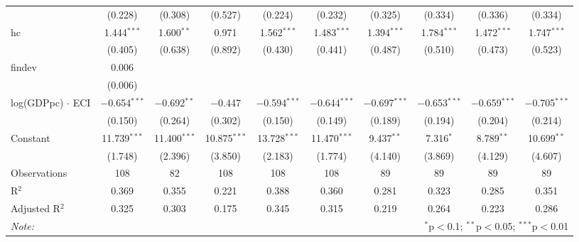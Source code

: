 \begin{tabular}{@{\hspace{5pt}}l@{\hspace{5pt}}ccccccccc}
  & (0.228) & (0.308) & (0.527) & (0.224) & (0.232) & (0.325) & (0.334) & (0.336) & (0.334) \\ 
 \addlinespace 
 hc & 1.444$^{***}$ & 1.600$^{**}$ & 0.971 & 1.562$^{***}$ & 1.483$^{***}$ & 1.394$^{***}$ & 1.784$^{***}$ & 1.472$^{***}$ & 1.747$^{***}$ \\ 
  & (0.405) & (0.638) & (0.892) & (0.430) & (0.441) & (0.487) & (0.510) & (0.473) & (0.523) \\ 
 \addlinespace 
 findev & 0.006 &  &  &  &  &  &  &  &  \\ 
  & (0.006) &  &  &  &  &  &  &  &  \\ 
 \addlinespace 
 log(GDPpc) $\cdot$ ECI & $-$0.654$^{***}$ & $-$0.692$^{**}$ & $-$0.447 & $-$0.594$^{***}$ & $-$0.644$^{***}$ & $-$0.697$^{***}$ & $-$0.653$^{***}$ & $-$0.659$^{***}$ & $-$0.705$^{***}$ \\ 
  & (0.150) & (0.264) & (0.302) & (0.150) & (0.149) & (0.189) & (0.194) & (0.204) & (0.214) \\ 
 \addlinespace 
 Constant & 11.739$^{***}$ & 11.400$^{***}$ & 10.875$^{***}$ & 13.728$^{***}$ & 11.470$^{***}$ & 9.437$^{**}$ & 7.316$^{*}$ & 8.789$^{**}$ & 10.699$^{**}$ \\ 
  & (1.748) & (2.396) & (3.850) & (2.183) & (1.774) & (4.140) & (3.869) & (4.129) & (4.607) \\ 
 \addlinespace 
\midrule  
Observations & 108 & 82 & 108 & 108 & 108 & 89 & 89 & 89 & 89 \\ 
R$^{2}$ & 0.369 & 0.355 & 0.221 & 0.388 & 0.360 & 0.281 & 0.323 & 0.285 & 0.351 \\ 
Adjusted R$^{2}$ & 0.325 & 0.303 & 0.175 & 0.345 & 0.315 & 0.219 & 0.264 & 0.223 & 0.286 \\ 
\bottomrule 
\textit{Note:}  & \multicolumn{9}{r}{$^{*}$p$<$0.1; $^{**}$p$<$0.05; $^{***}$p$<$0.01} \\ 
\end{tabular} 
